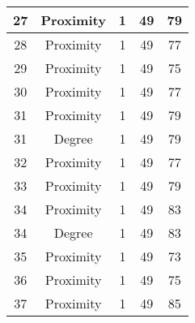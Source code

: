 \documentclass[results.tex]{subfiles}
\begin{document}
\begin{center}
\begin{tabular}{| c || c | c | c | c |}
            \hline
            27                      & Proximity                    & 1                      & 49                      & 79                   \\
            \hline
            28                      & Proximity                    & 1                      & 49                      & 77                   \\
            \hline
            29                      & Proximity                    & 1                      & 49                      & 75                   \\
            \hline
            30                      & Proximity                    & 1                      & 49                      & 77                   \\
            \hline
            31                      & Proximity                    & 1                      & 49                      & 79                   \\
            \hline
            31                      & Degree                       & 1                      & 49                      & 79                   \\
            \hline
            32                      & Proximity                    & 1                      & 49                      & 77                   \\
            \hline
            33                      & Proximity                    & 1                      & 49                      & 79                   \\
            \hline
            34                      & Proximity                    & 1                      & 49                      & 83                   \\
            \hline
            34                      & Degree                       & 1                      & 49                      & 83                   \\
            \hline
            35                      & Proximity                    & 1                      & 49                      & 73                   \\
            \hline
            36                      & Proximity                    & 1                      & 49                      & 75                   \\
            \hline
            37                      & Proximity                    & 1                      & 49                      & 85                   \\

\end{tabular}
\end{center}
\end{document}
